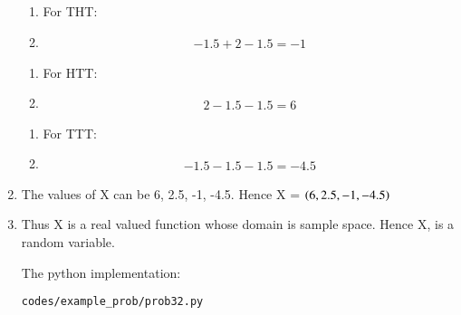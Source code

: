 \begin{enumerate}
\begin{enumerate}
\item For THT:
\item
\begin{align}
-1.5+2-1.5 = -1
\end{align}
\end{enumerate}

\begin{enumerate}
\item For HTT:
\item
\begin{align}
2-1.5-1.5 = 6
\end{align}
\end{enumerate}

\begin{enumerate}
\item For TTT:
\item
\begin{align}
-1.5-1.5-1.5 = -4.5
\end{align}
\end{enumerate}

\item The values of X can be 6, 2.5, -1, -4.5. Hence X = $\left(6, 2.5, -1, -4.5\right)$

\item Thus  X is a real valued function whose domain is sample space. Hence X, is a random variable.

The python implementation:
\begin{lstlisting}
codes/example_prob/prob32.py
\end{lstlisting}

\end{enumerate}